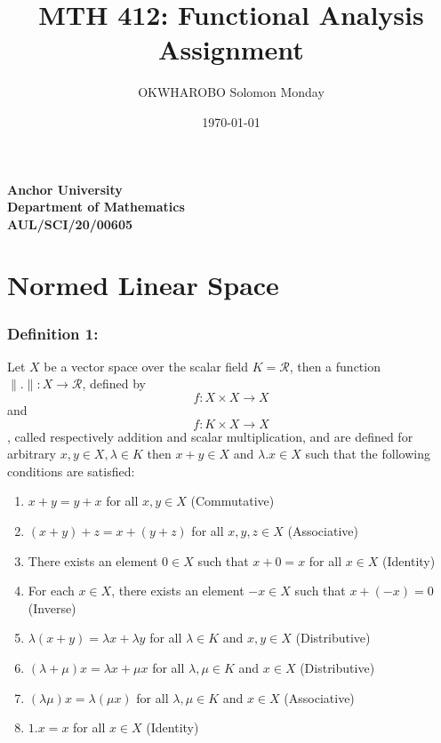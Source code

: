 \documentclass[12pt]{article}
\title{MTH 412: Functional Analysis Assignment}
\author{OKWHAROBO Solomon Monday}
\date{\today}
\begin{document}
\maketitle
\tableofcontents

\thispagestyle{empty} %

\begin{center}
    \vspace{6cm}
    \textbf{Anchor University} \\
    \textbf{Department of Mathematics} \\
    \textbf{AUL/SCI/20/00605}
\end{center}





\newpage

\setcounter{page}{1} %

\section{Normed Linear Space}
\subsubsection*{Definition 1:}
Let $X$ be a vector space over the scalar field $K = \mathcal{R}$, then a function $\|.\|: X \to \mathcal{R}$, defined by 
\[f: X \times X \to X\] and \[f: K \times X \to X\], called respectively addition and scalar multiplication, and are defined for arbitrary $x,y \in X, \lambda \in K$ then $x+y \in X$ and $\lambda.x \in X$ such that the following conditions are satisfied:
\begin{enumerate}
    \item $x + y = y + x$ for all $x, y \in X$ (Commutative)
    \item $(x + y) + z = x + (y + z)$ for all $x, y, z \in X$ (Associative)
    \item There exists an element $0 \in X$ such that $x + 0 = x$ for all $x \in X$ (Identity)
    \item For each $x \in X$, there exists an element $-x \in X$ such that $x + (-x) = 0$ (Inverse)
    \item $\lambda(x + y) = \lambda x + \lambda y$ for all $\lambda \in K$ and $x, y \in X$ (Distributive)
    \item $(\lambda + \mu)x = \lambda x + \mu x$ for all $\lambda, \mu \in K$ and $x \in X$ (Distributive)
    \item $(\lambda \mu)x = \lambda(\mu x)$ for all $\lambda, \mu \in K$ and $x \in X$ (Associative)
    \item $1.x = x$ for all $x \in X$ (Identity)
\end{enumerate}
\end{document}
